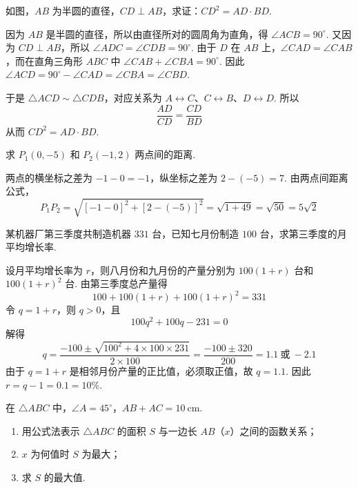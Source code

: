 \begin{problem}
如图，\(AB\) 为半圆的直径，\(CD\perp AB\)，求证：\(CD^2=AD\cdot BD\).

\end{problem}

\begin{solution}
因为 \(AB\) 是半圆的直径，所以由直径所对的圆周角为直角，得 \(\angle ACB=90^\circ\). 又因为 \(CD\perp AB\)，所以 \(\angle ADC=\angle CDB=90^\circ\). 由于 \(D\) 在 \(AB\) 上，\(\angle CAD=\angle CAB\)，而在直角三角形 \(ABC\) 中 \(\angle CAB+\angle CBA=90^\circ\). 因此 \(\angle ACD=90^\circ-\angle CAD=\angle CBA=\angle CBD\).

于是 \(\triangle ACD\sim\triangle CDB\)，对应关系为 \(A\leftrightarrow C\)、\(C\leftrightarrow B\)、\(D\leftrightarrow D\). 所以
\[
\frac{AD}{CD}=\frac{CD}{BD}
\]
从而 \(CD^2=AD\cdot BD\).
\end{solution}

\begin{problem}
求 \(P_1\left(0,-5\right)\) 和 \(P_2\left(-1,2\right)\) 两点间的距离.
\end{problem}

\begin{solution}
两点的横坐标之差为 \(-1-0=-1\)，纵坐标之差为 \(2-(-5)=7\). 由两点间距离公式，
\[
P_1P_2=\sqrt{\left[-1-0\right]^2+\left[2-(-5)\right]^2}=\sqrt{1+49}=\sqrt{50}=5\sqrt2
\]
\end{solution}

\begin{problem}
某机器厂第三季度共制造机器 \(331\text{ 台}\)，已知七月份制造 \(100\text{ 台}\)，求第三季度的月平均增长率.
\end{problem}

\begin{solution}
设月平均增长率为 \(r\)，则八月份和九月份的产量分别为 \(100(1+r)\) 台和 \(100(1+r)^2\) 台. 由第三季度总产量得
\[
100+100(1+r)+100(1+r)^2=331
\]
令 \(q=1+r\)，则 \(q>0\)，且
\[
100q^2+100q-231=0
\]
解得
\[
q=\frac{-100\pm\sqrt{100^2+4\times100\times231}}{2\times100}=\frac{-100\pm320}{200}=1.1\ \text{或}\ -2.1
\]
由于 \(q=1+r\) 是相邻月份产量的正比值，必须取正值，故 \(q=1.1\). 因此 \(r=q-1=0.1=10\%\).
\end{solution}

\begin{problem}
在 \(\triangle ABC\) 中，\(\angle A=45^\circ\)，\(AB+AC=10\mathrm{~cm}\).

\begin{enumerate}
\item 用公式法表示 \(\triangle ABC\) 的面积 \(S\) 与一边长 \(AB\)（\(x\)）之间的函数关系；
\item \(x\) 为何值时 \(S\) 为最大；
\item 求 \(S\) 的最大值.
\end{enumerate}
\end{problem}

